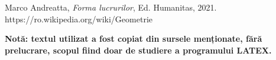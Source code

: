 \documentclass{article}
\begin{document}
\hfill\break
\hfill\break
\hfill\break
\hfill\break

\renewcommand\refname{Bibliografie}
\begin{thebibliography}{9}

  Marco Andreatta, \textit{Forma lucrurilor}, Ed. Humanitas, 2021.
  https://ro.wikipedia.org/wiki/Geometrie

\end{thebibliography}

\hfill\break
\hfill\break
\hfill\break
\hfill\break
\hfill\break
\hfill\break
\hfill\break
\hfill\break
\hfill\break

\begin{center}
\textbf{Notă: textul utilizat a fost copiat din sursele menționate, fără prelucrare, scopul fiind doar de studiere a programului LATEX.}
\end{center}
\end{document}
